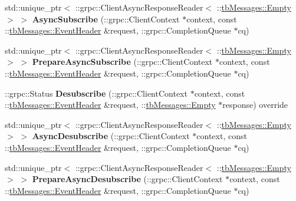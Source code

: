 \begin{DoxyCompactItemize}
\item 
\mbox{\label{classtbMessages_1_1TarboraMessages_1_1Stub_ad7cdb8a4d65035f312d9e9a2cf8e84fc}} 
std\+::unique\+\_\+ptr$<$ \+::grpc\+::\+Client\+Async\+Response\+Reader$<$ \+::\hyperlink{classtbMessages_1_1Empty}{tb\+Messages\+::\+Empty} $>$ $>$ {\bfseries Async\+Subscribe} (\+::grpc\+::\+Client\+Context $\ast$context, const \+::\hyperlink{classtbMessages_1_1EventHeader}{tb\+Messages\+::\+Event\+Header} \&request, \+::grpc\+::\+Completion\+Queue $\ast$cq)
\item 
\mbox{\label{classtbMessages_1_1TarboraMessages_1_1Stub_a2e7fedd4f7f9e700d627ccc4c869b05d}} 
std\+::unique\+\_\+ptr$<$ \+::grpc\+::\+Client\+Async\+Response\+Reader$<$ \+::\hyperlink{classtbMessages_1_1Empty}{tb\+Messages\+::\+Empty} $>$ $>$ {\bfseries Prepare\+Async\+Subscribe} (\+::grpc\+::\+Client\+Context $\ast$context, const \+::\hyperlink{classtbMessages_1_1EventHeader}{tb\+Messages\+::\+Event\+Header} \&request, \+::grpc\+::\+Completion\+Queue $\ast$cq)
\item 
\mbox{\label{classtbMessages_1_1TarboraMessages_1_1Stub_ab9af92d4d3919cadb87c03006b599ad3}} 
\+::grpc\+::\+Status {\bfseries Desubscribe} (\+::grpc\+::\+Client\+Context $\ast$context, const \+::\hyperlink{classtbMessages_1_1EventHeader}{tb\+Messages\+::\+Event\+Header} \&request, \+::\hyperlink{classtbMessages_1_1Empty}{tb\+Messages\+::\+Empty} $\ast$response) override
\item 
\mbox{\label{classtbMessages_1_1TarboraMessages_1_1Stub_afc26fdd5addc98b4ba35202da23d1ec2}} 
std\+::unique\+\_\+ptr$<$ \+::grpc\+::\+Client\+Async\+Response\+Reader$<$ \+::\hyperlink{classtbMessages_1_1Empty}{tb\+Messages\+::\+Empty} $>$ $>$ {\bfseries Async\+Desubscribe} (\+::grpc\+::\+Client\+Context $\ast$context, const \+::\hyperlink{classtbMessages_1_1EventHeader}{tb\+Messages\+::\+Event\+Header} \&request, \+::grpc\+::\+Completion\+Queue $\ast$cq)
\item 
\mbox{\label{classtbMessages_1_1TarboraMessages_1_1Stub_ab258db711eb0ad130e6dac9e1816a944}} 
std\+::unique\+\_\+ptr$<$ \+::grpc\+::\+Client\+Async\+Response\+Reader$<$ \+::\hyperlink{classtbMessages_1_1Empty}{tb\+Messages\+::\+Empty} $>$ $>$ {\bfseries Prepare\+Async\+Desubscribe} (\+::grpc\+::\+Client\+Context $\ast$context, const \+::\hyperlink{classtbMessages_1_1EventHeader}{tb\+Messages\+::\+Event\+Header} \&request, \+::grpc\+::\+Completion\+Queue $\ast$cq)

\end{DoxyCompactItemize}
